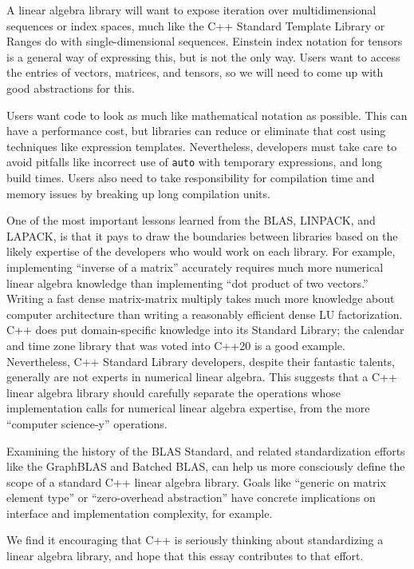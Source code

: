 A linear algebra library will want to expose iteration over
multidimensional sequences or index spaces, much like the C++ Standard
Template Library or Ranges do with single-dimensional sequences.
Einstein index notation for tensors is a general way of expressing
this, but is not the only way.  Users want to access the entries of
vectors, matrices, and tensors, so we will need to come up with good
abstractions for this.

Users want code to look as much like mathematical notation as
possible.  This can have a performance cost, but libraries can reduce
or eliminate that cost using techniques like expression templates.
Nevertheless, developers must take care to avoid pitfalls like
incorrect use of \texttt{auto} with temporary expressions, and long
build times.  Users also need to take responsibility for compilation
time and memory issues by breaking up long compilation units.

One of the most important lessons learned from the BLAS, LINPACK, and
LAPACK, is that it pays to draw the boundaries between libraries based
on the likely expertise of the developers who would work on each
library.  For example, implementing ``inverse of a matrix'' accurately
requires much more numerical linear algebra knowledge than
implementing ``dot product of two vectors.''  Writing a fast dense
matrix-matrix multiply takes much more knowledge about computer
architecture than writing a reasonably efficient dense LU
factorization.  C++ does put domain-specific knowledge into its
Standard Library; the calendar and time zone library \cite{P0355r7}
that was voted into C++20 is a good example.  Nevertheless, C++
Standard Library developers, despite their fantastic talents,
generally are not experts in numerical linear algebra.  This suggests
that a C++ linear algebra library should carefully separate the
operations whose implementation calls for numerical linear algebra
expertise, from the more ``computer science-y'' operations.

Examining the history of the BLAS Standard, and related
standardization efforts like the GraphBLAS and Batched BLAS, can help
us more consciously define the scope of a standard C++ linear algebra
library.  Goals like ``generic on matrix element type'' or
``zero-overhead abstraction'' have concrete implications on interface
and implementation complexity, for example.

We find it encouraging that C++ is seriously thinking about
standardizing a linear algebra library, and hope that this essay
contributes to that effort.

